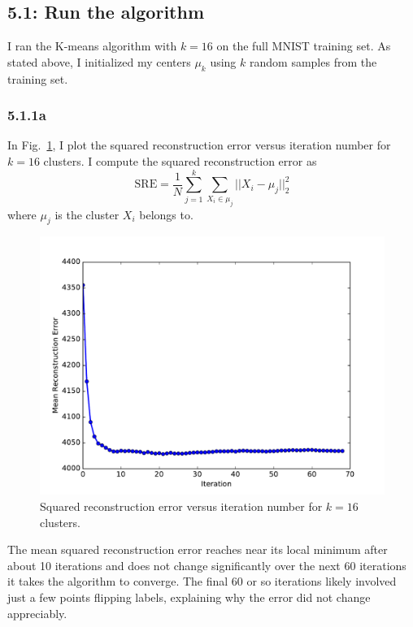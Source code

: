 \documentclass[12pt]{amsart}
\begin{document}
\subsection*{5.1: Run the algorithm}

I ran the K-means algorithm with $k = 16$ on the full MNIST training set.  As stated above, I initialized my centers $\mu_k$ using $k$ random samples from the training set.

\subsubsection*{5.1.1a}

In Fig.~\ref{fig:k_16_rec_err}, I plot the squared reconstruction error versus iteration number for $k = 16$ clusters.  I compute the squared reconstruction error as
\begin{equation} \label{eqn:sq_rec_err}
\text{SRE} = \frac{1}{N} \sum_{j = 1}^k\sum_{X_i \in \mu_j} || X_i - \mu_j ||_2^2
\end{equation}
where $\mu_j$ is the cluster $X_i$ belongs to.

\begin{figure}[H]
	\includegraphics[width=\columnwidth]{k_16_rec_err.pdf}
    \caption{Squared reconstruction error versus iteration number for $k = 16$ clusters.}
    \label{fig:k_16_rec_err}
\end{figure}

The mean squared reconstruction error reaches near its local minimum after about 10 iterations and does not change significantly over the next 60 iterations it takes the algorithm to converge.  The final 60 or so iterations likely involved just a few points flipping labels, explaining why the error did not change appreciably.
\end{document}
